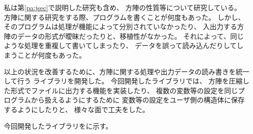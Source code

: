 \def \wrkdir {p.libms/}

 \label{pa:libms}
私は第\ref{pa:jsec}\postmpartname{}で説明した研究も含め、
方陣の性質等について研究している。
方陣に関する研究をする際、プログラムを書くことが何度もあった。
しかし、そのプログラムは処理が機能によって分別されていなかったり、
入出力する方陣のデータの形式が曖昧だったりと、移植性がなかった。
それによって、同じような処理を重複して書いてしまったり、
データを誤って読み込んだりしてしまうことが何度もあった。

以上の状況を改善するために、方陣に関する処理や出力データの読み書きを統一して行う
ライブラリを開発した。
今回開発したライブラリでは、
方陣を圧縮した形式でファイルに出力する機能を実装したり、
複数の変数等の設定を同じプログラムから扱えるようにするために
変数等の設定をユーザ側の構造体に保存するようにしたりと、
様々な面で工夫をした。

今回開発したライブラリを\cite{bib:libms}に示す。

